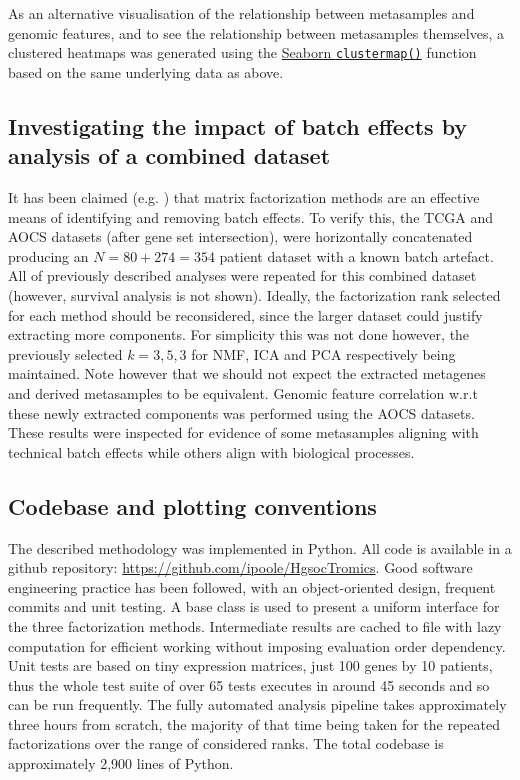 \documentclass[tikz, 12pt,a4paper,oneside,fleqn]{article}
\begin{document}
As an alternative visualisation of the relationship between metasamples and genomic features, and to see the relationship between metasamples themselves, a clustered heatmaps was generated using the \href{https://seaborn.pydata.org/generated/seaborn.clustermap.html}{Seaborn {\tt clustermap()}} function based on the same underlying data as above.  

\subsection{Investigating the impact of batch effects by analysis of a combined dataset}

It has been claimed (e.g. \cite{Stein-OBrien2018,Renard2016}) that matrix factorization methods are an effective means of identifying and removing batch effects.  To verify this, the TCGA and AOCS datasets (after gene set intersection), were horizontally concatenated producing an $N=80+274=354$ patient dataset with a known batch artefact.  All of previously described analyses were repeated for this combined dataset (however, survival analysis is not shown).  Ideally, the factorization rank selected for each method should be reconsidered, since the larger dataset could justify extracting more components.  For simplicity this was not done however, the previously selected $k = 3,5,3$ for NMF, ICA and PCA respectively being maintained.   Note however that we should not expect the extracted metagenes and derived metasamples to be equivalent. Genomic feature correlation w.r.t these newly extracted components was performed using the AOCS datasets.  These results were inspected for evidence of some metasamples aligning with technical batch effects while others align with biological processes.

\subsection{Codebase and plotting conventions}

The described methodology was implemented in Python.
All code is available in a github repository: \url{https://github.com/ipoole/HgsocTromics}.  Good software engineering practice has been followed, with an object-oriented design, frequent commits and unit testing.  A base class is used to present a uniform interface for the three factorization methods.  Intermediate results are cached to file with lazy computation for efficient working without imposing evaluation order dependency.  Unit tests are based on tiny expression matrices, just 100 genes by 10 patients, thus the whole test suite of over 65 tests executes in around 45 seconds and so can be run frequently.   The fully automated analysis pipeline takes approximately three hours from scratch, the majority of that time being taken for the repeated factorizations over the range of considered ranks.  The total codebase is approximately 2,900 lines of Python.  
\end{document}
